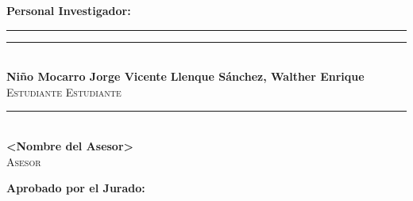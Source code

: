 

	\begin{flushleft}
	\large {\textbf{Personal Investigador:}}
	\end{flushleft}

		\vspace{1.25cm}
	\begin{flushleft}
	\rule{70mm}{0.2mm} \hspace{0.3cm} \rule{83mm}{0.2mm}\\
	\large  {\textbf{Niño Mocarro Jorge Vicente}} \hspace{0.36cm} \large {\textbf{Llenque Sánchez, Walther Enrique}}\\ 					\hspace{2.20cm}\textsc{Estudiante} \hspace{5cm}\textsc{Estudiante}
	\end{flushleft}
		\vspace{2cm} %
		
		\begin{center}
		\rule{70mm}{0.2mm}\\
		\large{\textbf{<Nombre del Asesor>}}\\
		\textsc{Asesor}
		\end{center}
	\vspace{0.35cm}
\begin{flushleft}
\large{\textbf{Aprobado por el Jurado:}}
\end{flushleft}

